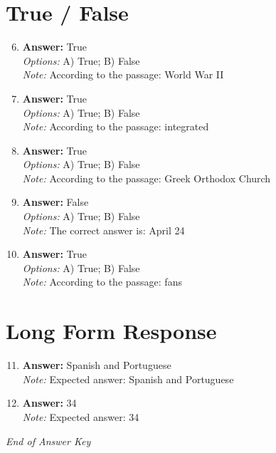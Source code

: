 \documentclass[12pt]{article}
\begin{document}
\section*{True / False}
\begin{enumerate}[label=\arabic*.]
\setcounter{enumi}{5}
\item \textbf{Answer:} True
\\ \textit{Options:} A) True; B) False
\\ \textit{Note:} According to the passage: World War II
\item \textbf{Answer:} True
\\ \textit{Options:} A) True; B) False
\\ \textit{Note:} According to the passage: integrated
\item \textbf{Answer:} True
\\ \textit{Options:} A) True; B) False
\\ \textit{Note:} According to the passage: Greek Orthodox Church
\item \textbf{Answer:} False
\\ \textit{Options:} A) True; B) False
\\ \textit{Note:} The correct answer is: April 24
\item \textbf{Answer:} True
\\ \textit{Options:} A) True; B) False
\\ \textit{Note:} According to the passage: fans
\end{enumerate}

\section*{Long Form Response}
\begin{enumerate}[label=\arabic*.]
\setcounter{enumi}{10}
\item \textbf{Answer:} Spanish and Portuguese
\\ \textit{Note:} Expected answer: Spanish and Portuguese
\item \textbf{Answer:} 34
\\ \textit{Note:} Expected answer: 34
\end{enumerate}

\vfill
\noindent\textit{End of Answer Key}
\end{document}
